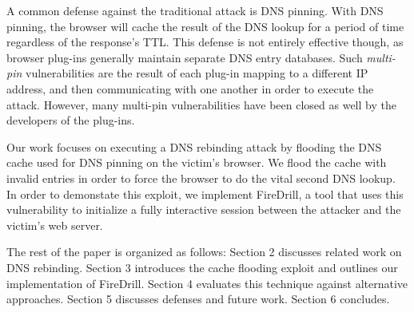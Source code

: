 A common defense against the traditional attack is DNS pinning. With DNS pinning, the browser will cache the result of the DNS lookup for a period of time regardless of the response's TTL. This defense is not entirely effective though, as browser plug-ins generally maintain separate DNS entry databases. Such \emph{multi-pin} vulnerabilities are the result of each plug-in mapping to a different IP address, and then communicating with one another in order to execute the attack. However, many multi-pin vulnerabilities have been closed as well by the developers of the plug-ins. 

Our work focuses on executing a DNS rebinding attack by flooding the DNS cache used for DNS pinning on the victim's browser. We flood the cache with invalid entries in order to force the browser to do the vital second DNS lookup. In order to demonstate this exploit, we implement FireDrill, a tool that uses this vulnerability to initialize a fully interactive session between the attacker and the victim's web server.

The rest of the paper is organized as follows: Section 2 discusses related work on DNS rebinding. Section 3 introduces the cache flooding exploit and outlines our implementation of FireDrill. Section 4 evaluates this technique against alternative approaches. Section 5 discusses defenses and future work. Section 6 concludes.
